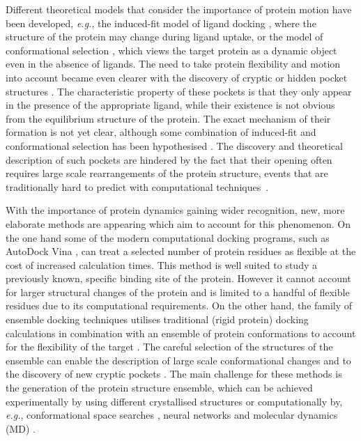 Different theoretical models that consider the importance of protein motion have been developed, {\it e.g.}, the induced-fit model of ligand docking \cite{first_induced-fit,induced-fit}, where the structure of the protein may change during ligand uptake, or the model of conformational selection \cite{conf_selection1,conf_selection2,cosolvent_md}, which views the target protein as a dynamic object even in the absence of ligands.    The need to take protein flexibility and motion into account became even clearer with the discovery of cryptic or hidden pocket structures \cite{kras,understanding_crypt,cryptic_review}.
The characteristic property of these pockets is that they only appear in the presence of the appropriate ligand, while their existence is not obvious from the equilibrium structure of the protein.
The exact mechanism of their formation is not yet clear, although some combination of induced-fit and conformational selection has been hypothesised \cite{understanding_crypt}.
The discovery and theoretical description of such pockets are hindered by the fact that their opening often requires large scale rearrangements of the protein structure, events that are traditionally hard to predict with computational techniques~\cite{cryptosite}.

With the importance of protein dynamics gaining wider recognition, new, more elaborate methods are appearing which aim to account for this phenomenon. On the one hand some of the modern computational docking programs, such as AutoDock Vina \cite{vina}, can treat a selected number of protein residues as flexible at the cost of increased calculation times.
This method is well suited to study a previously known, specific binding site of the protein. However it cannot account for larger structural changes of the protein and is limited to a handful of flexible residues due to its computational requirements. On the other hand, the family of ensemble docking techniques utilises traditional (rigid protein) docking calculations in combination with an ensemble of protein conformations to account for the flexibility of the target \cite{docking_to_ensemble,ensemble_discovery}.
The careful selection of the structures of the ensemble can enable the description of large scale conformational changes and to the discovery of new cryptic pockets \cite{cryptosite,cosolvent_md,cryptic_review}.
The main challenge for these methods is the generation of the protein structure ensemble, which can be achieved experimentally by using different crystallised structures \cite{docking_to_ensemble,crystal_ensemble1,crystal_ensemble2} or computationally by, {\it e.g.}, conformational space searches \cite{rosettarelax}, neural networks \cite{elastic_NN_ensemble} and molecular dynamics (MD) \cite{ensemble_discovery,md_for_ensemble}. 

